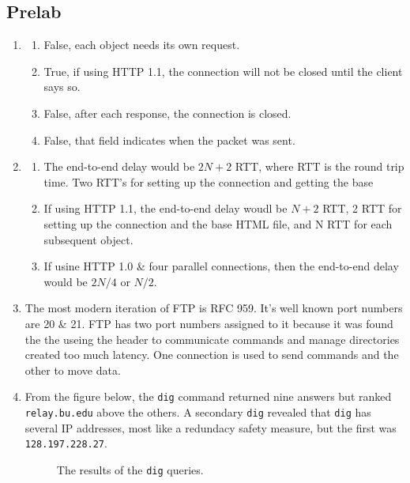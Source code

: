 \documentclass[12pt]{article}
\title{\assignmenttype}
\author{Daniel Andronov}
\date{\displaydate{date}}
\begin{document}
\maketitle
\newpage

\subsection{Prelab}
\begin{enumerate}[label=\textbf{Question \arabic*)}]
	\item  \begin{enumerate}[label=\alph*)]
			\item False, each object needs its own request.  
			\item True, if using HTTP 1.1, the connection will not be closed until the client says so. 
			\item False, after each response, the connection is closed. 
			\item False, that field indicates when the packet was sent.
		\end{enumerate}
	\item  \begin{enumerate}[label=\alph*)]
			\item The end-to-end delay would be $2N + 2$ RTT, where RTT is the round trip time. Two RTT's for setting up the connection and getting the base
			\item If using HTTP 1.1, the end-to-end delay woudl be $N+2$ RTT, 2 RTT for setting up the connection and the base HTML file, and N RTT for each subsequent object.
			\item If usine HTTP 1.0 \& four parallel connections, then the end-to-end delay would be $2N/4$ or $N/2$. 
		\end{enumerate}
	\item The most modern iteration of FTP is RFC 959. It's well known port numbers are 20 \& 21. FTP has two port numbers assigned to it because it was found the the useing the header to communicate commands and manage directories created too much latency. One connection is used to send commands and the other to move data.
	\item From the figure below, the \texttt{dig} command returned nine answers but ranked \texttt{relay.bu.edu} above the others. A secondary \texttt{dig} revealed that \texttt{dig} has several IP addresses, most like a redundacy safety measure, but the first was \texttt{128.197.228.27}. 
		\begin{figure}[h]
			\caption{The results of the \texttt{dig} queries.}

\end{figure}
\end{enumerate}
\end{document}
